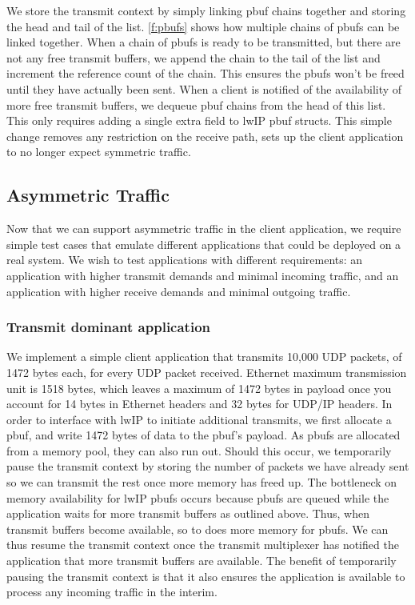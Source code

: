 We store the transmit context by simply linking pbuf chains together and storing the head and tail of the list. 
\autoref{f:pbufs} shows how multiple chains of pbufs can be linked together. When a chain of pbufs is ready to
be transmitted, but there are not any free transmit buffers, we append the chain to the tail of the list and 
increment the reference count of the chain. This ensures the pbufs won't be freed until they have actually been sent.
When a client is notified of the availability of more free transmit buffers, we dequeue pbuf chains from the head of
this list. This only requires adding a single extra field to lwIP pbuf structs. This simple change removes any
restriction on the receive path, sets up the client application to no longer expect symmetric traffic.\\

\subsection{Asymmetric Traffic}
Now that we can support asymmetric traffic in the client application, we require simple test cases that emulate different
applications that could be deployed on a real system. We wish to test
applications with different requirements: an application with higher transmit demands and minimal incoming traffic,
and an application with higher receive demands and minimal outgoing traffic. 

\subsubsection{Transmit dominant application}\label{s:transmit_dom}
We implement a simple client application that transmits 10,000 UDP packets, of 1472 bytes each, for every UDP packet received.
Ethernet maximum transmission unit is 1518 bytes, which leaves a maximum of 1472 bytes in payload once you account for 14 bytes
in Ethernet headers and 32 bytes for UDP/IP headers. 
In order to interface with lwIP to initiate additional transmits, we first allocate a pbuf, and write 1472 bytes of data
to the pbuf's payload. As pbufs are allocated from a memory pool, they can also run out. Should this occur, we temporarily
pause the transmit context by storing the number of packets we have already sent so we can transmit the rest once more 
memory has freed up. The bottleneck on memory availability for lwIP pbufs occurs because pbufs are queued while the application
waits for more transmit buffers as outlined above. Thus, when transmit buffers become available, so to does more memory for
pbufs. We can thus resume the transmit context once the transmit multiplexer has notified the application that more
transmit buffers are available. The benefit of temporarily pausing the transmit context is that it also ensures the application
is available to process any incoming traffic in the interim. 

